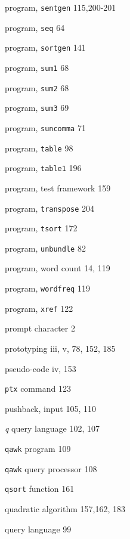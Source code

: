 \begin{multicols}{3}
\hangindent=3pc  program, \verb'sentgen' 115,200-201

\hangindent=3pc  program, \verb'seq' 64

\hangindent=3pc  program, \verb'sortgen' 141

\hangindent=3pc  program, \verb'sum1' 68

\hangindent=3pc  program, \verb'sum2' 68

\hangindent=3pc  program, \verb'sum3' 69



\hangindent=3pc  program, \verb'suncomma' 71

\hangindent=3pc  program, \verb'table' 98

\hangindent=3pc  program, \verb'table1' 196

\hangindent=3pc  program, test framework 159

\hangindent=3pc  program, \verb'transpose' 204

\hangindent=3pc  program, \verb'tsort' 172

\hangindent=3pc  program, \verb'unbundle' 82

\hangindent=3pc  program, word count 14, 119

\hangindent=3pc  program, \verb'wordfreq' 119

\hangindent=3pc  program, \verb'xref' 122

\hangindent=3pc  prompt character 2

\hangindent=3pc  prototyping iii, v, 78, 152, 185

\hangindent=3pc  pseudo-code iv, 153

\hangindent=3pc  \verb'ptx' command 123

\hangindent=3pc  pushback, input 105, 110

\hangindent=3pc  \textit{q} query language 102, 107

\hangindent=3pc  \verb'qawk' program 109

\hangindent=3pc  \verb'qawk' query processor 108

\hangindent=3pc  \verb'qsort' function 161

\hangindent=3pc  quadratic algorithm 157,162, 183

\hangindent=3pc  query language 99


\end{multicols}
